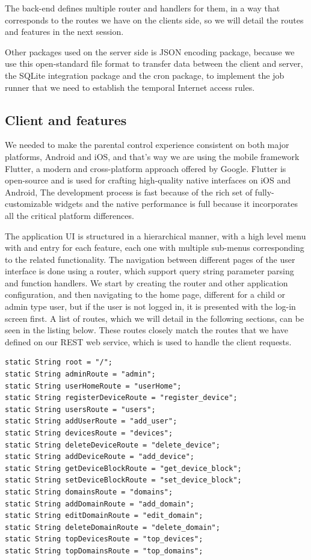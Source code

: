 The back-end defines multiple router and handlers for them, in a way that corresponds to the routes we have on the clients side, so we will detail the routes and features in the next session.

Other packages used on the server side is JSON encoding package, because we use this open-standard file format to transfer data between the client and server, the SQLite integration package and the cron package, to implement the job runner that we need to establish the temporal Internet access rules.

\subsection{Client and features}

We needed to make the parental control experience consistent on both major platforms, Android and iOS, and that's way we are using the mobile framework Flutter, a modern and cross-platform approach offered by Google. Flutter is open-source and is used for crafting high-quality native interfaces on iOS and Android, The development process is fast because of the rich set of fully-customizable widgets and the native performance is full because it incorporates all the critical platform differences.

The application UI is structured in a hierarchical manner, with a high level menu with and entry for each feature, each one with multiple sub-menus corresponding to the related functionality. The navigation between different pages of the user interface is done using a router, which support query string parameter parsing and function handlers. We start by creating the router and other application configuration, and then navigating to the home page, different for a child or admin type user, but if the user is not logged in, it is presented with the log-in screen first. A list of routes, which we will detail in the following sections, can be seen in the listing below. These routes closely match the routes that we have defined on our REST web service, which is used to handle the client requests.

\begin{lstlisting}
static String root = "/";
static String adminRoute = "admin";
static String userHomeRoute = "userHome";
static String registerDeviceRoute = "register_device";
static String usersRoute = "users";
static String addUserRoute = "add_user";
static String devicesRoute = "devices";
static String deleteDeviceRoute = "delete_device";
static String addDeviceRoute = "add_device";
static String getDeviceBlockRoute = "get_device_block";
static String setDeviceBlockRoute = "set_device_block";
static String domainsRoute = "domains";
static String addDomainRoute = "add_domain";
static String editDomainRoute = "edit_domain";
static String deleteDomainRoute = "delete_domain";
static String topDevicesRoute = "top_devices";
static String topDomainsRoute = "top_domains";
\end{lstlisting}

